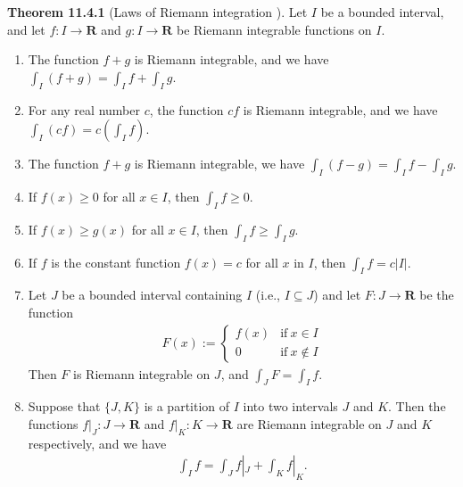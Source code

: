 \documentclass{book}
\newcommand{\titl}[1]{\noindent\textbf{#1}}
\begin{document}
\begin{framed}
\titl{Theorem 11.4.1} (Laws of Riemann integration ). Let $I$ be a bounded interval, and let $f:I\to\mathbf{R}$ and $g:I\to\mathbf{R}$ be Riemann integrable functions on $I$.
\begin{enumerate}
    \item The function $f+g$ is Riemann integrable, and we have $\int_{I}(f+g)=\int_{I}f+\int_{I}g$.
    \item For any real number $c$, the function $cf$ is Riemann integrable, and we have $\int_{I}(cf)=c(\int_{I}f)$.
    \item The function $f+g$ is Riemann integrable, we have $\int_{I}(f-g)=\int_{I}f-\int_{I}g$.
    \item If $f(x)\geq 0$ for all $x\in I$, then $\int_{I}f\geq 0$.
    \item If $f(x)\geq g(x)$ for all $x\in I$, then $\int_{I}f\geq \int_{I}g$.
    \item If $f$ is the constant function $f(x)=c$ for all $x$ in $I$, then $\int_{I}f=c|I|$.
    \item Let $J$ be a bounded interval containing $I$ (i.e., $I\subseteq J$) and let $F:J\to\mathbf{R}$ be the function
        \begin{align*}
            F(x):=\left\{\begin{array}{ll}
                f(x)&\text{if}\ x\in I\\
                0   &\text{if}\ x\notin I
            \end{array}\right.
        \end{align*}
    Then $F$ is Riemann integrable on $J$, and $\int_{J}F=\int_{I}f$.
    \item Suppose that $\{J,K\}$ is a partition of $I$ into two intervals $J$ and $K$. Then the functions $f|_J:J\to\mathbf{R}$ and $f|_K:K\to\mathbf{R}$ are Riemann integrable on $J$ and $K$ respectively, and we have
        \begin{align*}
            \int_{I}f=\int_{J}f|_J+\int_{K}f|_K.
        \end{align*}
\end{enumerate}
\end{framed}
\end{document}
